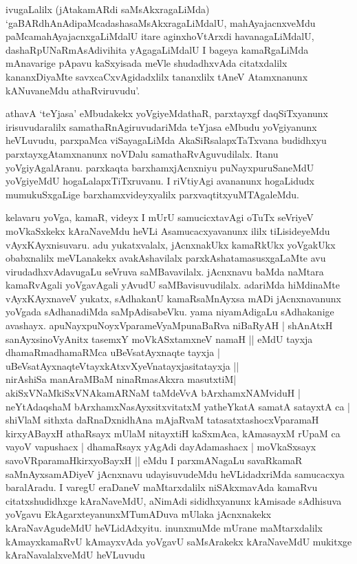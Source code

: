 \begin{artha}
ivugaLalilx (jAtakamARdi saMsAkxragaLiMda) `gaBARdhAnAdipaMcadashasaMsAkxragaLiMdalU, mahAyajacnxveMdu paMcamahAyajacnxgaLiMdalU itare aginxhoVtArxdi havanagaLiMdalU, dashaRpUNaRmAsAdivihita yAgagaLiMdalU I bageya kamaRgaLiMda mAnavarige pApavu kaSxyisada meVle shudadhxvAda citatxdalilx kananxDiyaMte savxcaCxvAgidadxlilx tananxlilx tAneV Atamxnanunx kANuvaneMdu athaRviruvudu'. 

athavA `teYjasa' eMbudakekx yoVgiyeMdathaR, parxtayxgf daqSiTxyanunx irisuvudaralilx samathaRnAgiruvudariMda teYjasa eMbudu yoVgiyanunx heVLuvudu, parxpaMca viSayagaLiMda AkaSiRsalapxTaTxvana budidhxyu parxtayxgAtamxnanunx noVDalu samathaRvAguvudilalx. Itanu yoVgiyAgalAranu. parxkaqta barxhamxjAcnxniyu puNayxpuruSaneMdU yoVgiyeMdU hogaLalapxTiTxruvanu. I riVtiyAgi avananunx hogaLidudx mumukuSxgaLige barxhamxvideyxyalilx parxvaqtitxyuMTAgaleMdu. 

kelavaru yoVga, kamaR, videyx I mUrU samucicxtavAgi oTuTx seVriyeV moVkaSxkekx kAraNaveMdu heVLi Asamucacxyavanunx ililx tiLisideyeMdu vAyxKAyxnisuvaru. adu yukatxvalalx, jAcnxnakUkx kamaRkUkx yoVgakUkx obabxnalilx meVLanakekx avakAshavilalx parxkAshatamasusxgaLaMte avu virudadhxvAdavugaLu seVruva saMBavavilalx. jAcnxnavu baMda naMtara kamaRvAgali yoVgavAgali yAvudU saMBavisuvudilalx. adariMda hiMdinaMte vAyxKAyxnaveV yukatx, sAdhakanU kamaRsaMnAyxsa mADi jAcnxnavanunx yoVgada sAdhanadiMda saMpAdisabeVku. yama niyamAdigaLu sAdhakanige avashayx. \ndash  apuNayxpuNoyxVparameVyaMpunaBaRva niBaRyAH | shAnAtxH sanAyxsinoVyAnitx tasemxY moVkASxtamxneV namaH || eMdU tayxja dhamaRmadhamaRMca uBeVsatAyxnaqte tayxja |\\
uBeVsatAyxnaqteVtayxkAtxvXyeVnatayxjasitatayxja ||\\
nirAshiSa manAraMBaM ninaRmasAkxra masutxtiM|\\
akiSxVNaMkiSxVNAkamARNaM taMdeVvA bArxhamxNAMviduH |\\
neYtAdaqshaM bArxhamxNasAyxsitxvitatxM yatheYkatA samatA satayxtA ca | shiVlaM sithxta daRnaDxnidhAna mAjaRvaM tatasatxtashocxVparamaH kirxyABayxH athaRsayx mUlaM nitayxtiH kaSxmAca, kAmasayxM rUpaM ca vayoV vapushacx | dhamaRsayx yAgAdi dayAdamashacx | moVkaSxsayx savoVRparamaHkirxyoBayxH || eMdu I parxmANagaLu savaRkamaR saMnAyxsamADiyeV jAcnxnavu udayisuvudeMdu heVLidadxriMda samucacxya baralAradu. I varegU eraDaneV maMtarxdalilx niSAkxmavAda kamaRvu citatxshudidhxge kAraNaveMdU, aNimAdi sididhxyanunx kAmisade sAdhisuva yoVgavu EkAgarxteyanunxMTumADuva mUlaka jAcnxnakekx kAraNavAgudeMdU heVLidAdxyitu. inunxmuMde mUrane maMtarxdalilx kAmayxkamaRvU kAmayxvAda yoVgavU saMsArakekx kAraNaveMdU mukitxge kAraNavalalxveMdU heVLuvudu\ndash 
\end{artha}

